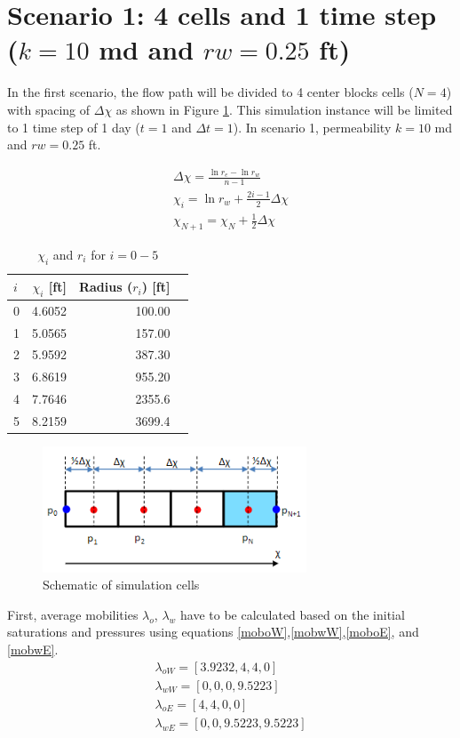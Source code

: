 \documentclass[12pt,letterpaper,titlepage]{article}
\begin{document}
\section{Scenario 1: 4 cells and 1 time step ($k=10$ md and $rw=0.25$ ft) }

In the first scenario, the flow path will be divided to 4 center blocks cells ($N=4$) with spacing of $\Delta\chi$ as shown in Figure \ref{fig:2}. This simulation instance will be limited to 1 time step of 1 day ($t=1$ and $\Delta t=1$). In scenario 1, permeability $k=10$ md and $rw=0.25$ ft.  


\begin{gather}\label{eq:dx}
\Delta\chi=\frac{\ln{r_e}-\ln{r_w}}{n-1}\\\label{eq:dx2}
\chi_i=\ln{r_w}+\frac{2i-1}{2}\Delta\chi\\\label{eq:dx3}
\chi_{N+1}=\chi_N+\frac{1}{2}\Delta\chi
\end{gather}
\begin{table}[h]
\centering
\begin{tabular}{lrrr}
$i$  & $\chi_i$ [ft]& Radius ($r_i$) [ft]  \\\hline
0 &4.6052 & 100.00\\
1& 5.0565 & 157.00\\
2& 5.9592 & 387.30\\
3 &6.8619 & 955.20\\
4& 7.7646 & 2355.6\\
5& 8.2159 & 3699.4\\
\hline
\end{tabular}
\caption{\label{tab:4}$\chi_i$ and $r_i$ for $i=0-5$}
\end{table}

\begin{figure}[p]
\centering
\includegraphics[width=0.7\textwidth]{Capture2.PNG}
\caption{\label{fig:2}Schematic of simulation cells}
\end{figure}
First, average mobilities $\lambda_o$, $\lambda_w$ have to be calculated based on the initial saturations and pressures using equations \ref{moboW},\ref{mobwW},\ref{moboE}, and \ref{mobwE}.
\begin{gather*}
\lambda_{oW}= [3.9232,4,4,0]		\\
\lambda_{wW}= [0,0,0,9.5223]		\\
\lambda_{oE}= [4,4,0,0]		\\
\lambda_{wE}= [0,0,9.5223,9.5223]		\\
\end{gather*}
\end{document}
